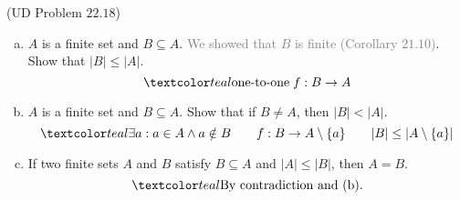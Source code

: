 %     
% 

\begin{frame}{}
  \begin{exampleblock}{(UD Problem $22.18$)}
    \begin{enumerate}[(a)]
      \item $A$ is a finite set and $B \subseteq A$. \textcolor{gray}{We showed that $B$ is finite (Corollary $21.10$)}. Show that $|B| \le |A|$.
	\pause
	\[
	  \teal{\text{one-to-one} \;f: B \to A}
	\]
      \item \pause $A$ is a finite set and $B \subseteq A$. Show that if $B \neq A$, then $|B| < |A|$.
	\pause
	\[
	  \teal{\exists a: a \in A \land a \notin B \qquad f: B \to A \setminus \set{a} \qquad |B| \le |A \setminus \set{a}|}
	\]
      \item \pause If two finite sets $A$ and $B$ satisfy $B \subseteq A$ and $|A| \le |B|$, then $A = B$.
	\pause
	\[
	  \teal{\text{By contradiction and (b).}}
	\]
    \end{enumerate}
  \end{exampleblock}
\end{frame}

% 
% 
% 

